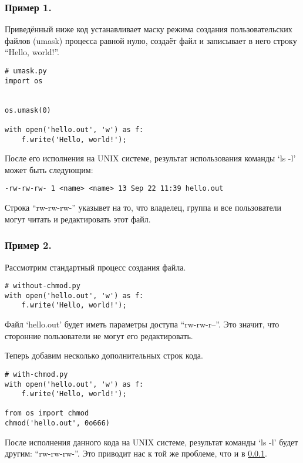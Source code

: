 \documentclass{article}
\begin{document}
			\subsubsection{Пример 1.}\label{example-1}
				Приведённый ниже код устанавливает маску режима создания пользовательских файлов (umask) процесса равной нулю, создаёт файл и записывает в него строку ``Hello, world!''.

				\begin{lstlisting}
# umask.py
import os


os.umask(0)

with open('hello.out', 'w') as f:
	f.write('Hello, world!');
				\end{lstlisting}

				\par После его исполнения на UNIX системе, результат использования команды `ls -l' может быть следующим:

				\begin{lstlisting}
-rw-rw-rw- 1 <name> <name> 13 Sep 22 11:39 hello.out
				\end{lstlisting}

				\par Строка ``rw-rw-rw-'' указывет на то, что владелец, группа и все пользователи могут читать и редактировать этот файл.

			\subsubsection{Пример 2.}
				Рассмотрим стандартный процесс создания файла.

				\begin{lstlisting}
# without-chmod.py
with open('hello.out', 'w') as f:
    f.write('Hello, world!');
                \end{lstlisting}

				\par Файл `hello.out' будет иметь параметры доступа ``rw-rw-r--''. Это значит, что сторонние пользователи не могут его редактировать.

				\par Теперь добавим несколько дополнительных строк кода.

				\begin{lstlisting}
# with-chmod.py
with open('hello.out', 'w') as f:
    f.write('Hello, world!');

from os import chmod
chmod('hello.out', 0o666)
                \end{lstlisting}

				\par После исполнения данного кода на UNIX системе, результат команды `ls -l' будет другим: ``rw-rw-rw-''. Это приводит нас к той же проблеме, что и в \ref{example-1}.
\end{document}

